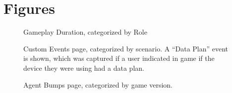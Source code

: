 \chapter{Figures}

\vspace*{-3in}

\begin{figure}[htb]
	\vspace{2.4in}
	\caption[Analytics Site: Gameplay Duration]{\label{fig:gameplay_duration} Gameplay Duration, categorized by Role}
\end{figure}
\clearpage
\newpage

\begin{figure}[htb]
	\vspace{2.4in}
	\caption[Analytics Site: Custom Events]{\label{fig:custom_events_ui} Custom Events page, categorized by scenario. A ``Data Plan'' event is shown, which was captured if a user indicated in game if the device they were using had a data plan.}
\end{figure}
\clearpage
\newpage

\begin{figure}[htb]
	\vspace{2.4in}
	\caption[Analytics Site: Agent Bumps]{\label{fig:agent_bumps_gv} Agent Bumps page, categorized by game version.}
\end{figure}
\clearpage
\newpage


